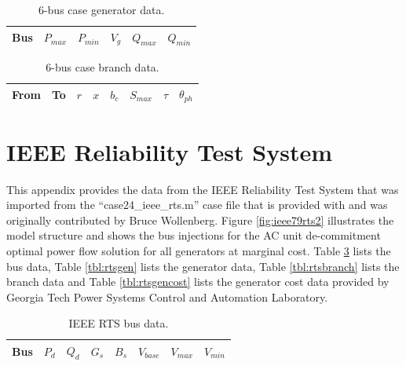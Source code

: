 \begin{table}[h]
\begin{center}
\begin{tabular}{c|c|c|c|c|c}
\hline
Bus &$P_{max}$ &$P_{min}$ &$V_g$ &$Q_{max}$ &$Q_{min}$\\
\hline\hline

\hline
\end{tabular}
\caption{6-bus case generator data.}
\label{tbl:case6ww_gen}
\end{center}
\end{table}

\begin{table}[h]
\begin{center}
\begin{tabular}{c|c|c|c|c|c|c|c}
\hline
From &To &$r$ &$x$ &$b_c$ &$S_{max}$ &$\tau$ &$\theta_{ph}$\\
\hline\hline

\hline
\end{tabular}
\caption{6-bus case branch data.}
\label{tbl:case6ww_branch}
\end{center}
\end{table}

\section{IEEE Reliability Test System}
\label{adx:ieee_rts}
This appendix provides the data from the IEEE Reliability Test System
\cite{ieee79rts} that was imported from the ``case24\_ieee\_rts.m'' case file
that is provided with \matpower and was originally contributed by Bruce
Wollenberg.  Figure \ref{fig:ieee79rts2} illustrates the model structure and
shows the bus injections for the AC unit de-commitment optimal power flow
solution for all generators at marginal cost.  Table \ref{tbl:rtsbus} lists the
bus data, Table \ref{tbl:rtsgen} lists the generator data, Table
\ref{tbl:rtsbranch} lists the branch data and Table \ref{tbl:rtsgencost} lists
the generator cost data provided by Georgia Tech Power Systems Control and
Automation Laboratory.


\begin{table}[h]
\begin{center}
\begin{tabular}{c|c|c|c|c|c|c|c}
\hline
Bus &$P_d$ &$Q_d$ &$G_s$ &$B_s$ &$V_{base}$ &$V_{max}$ &$V_{min}$\\
\hline\hline

\hline
\end{tabular}
\caption{IEEE RTS bus data.}
\label{tbl:rtsbus}
\end{center}
\end{table}

